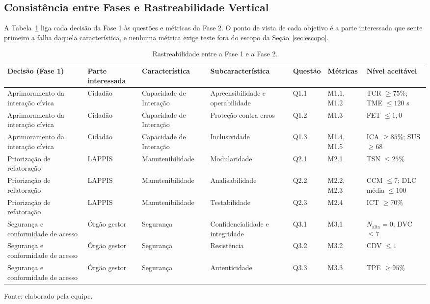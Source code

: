 \documentclass[journal]{IEEEtran}
\begin{document}
\subsection{Consistência entre Fases e Rastreabilidade Vertical}
\label{sec:rastreabilidade}

A Tabela~\ref{tab:rastreabilidade} liga cada decisão da Fase 1 às questões e métricas da Fase 2. O ponto de vista de cada objetivo é a parte interessada que sente primeiro a falha daquela característica, e nenhuma métrica exige teste fora do escopo da Seção~\ref{sec:escopo}.

\begin{table}[!t]
\centering
\caption{Rastreabilidade entre a Fase 1 e a Fase 2.}
\label{tab:rastreabilidade}
\footnotesize
\setlength{\tabcolsep}{4pt}
\begin{tabular}{@{}p{} p{} p{} p{} l p{} p{}@{}}
\toprule
\textbf{Decisão (Fase 1)} & \textbf{Parte interessada} & \textbf{Característica} & \textbf{Subcaracterística} & \textbf{Questão} & \textbf{Métricas} & \textbf{Nível aceitável} \\
\midrule
Aprimoramento da interação cívica & Cidadão & Capacidade de Interação & Apreensibilidade e operabilidade & Q1.1 & M1.1, M1.2 & TCR $\ge 75\%$; TME $\le 120$ s \\
Aprimoramento da interação cívica & Cidadão & Capacidade de Interação & Proteção contra erros & Q1.2 & M1.3 & FET $\le 1{,}0$ \\
Aprimoramento da interação cívica & Cidadão & Capacidade de Interação & Inclusividade & Q1.3 & M1.4, M1.5 & ICA $\ge 85\%$; SUS $\ge 68$ \\
Priorização de refatoração & LAPPIS & Manutenibilidade & Modularidade & Q2.1 & M2.1 & TSN $\le 25\%$ \\
Priorização de refatoração & LAPPIS & Manutenibilidade & Analisabilidade & Q2.2 & M2.2, M2.3 & CCM $\le 7$; DLC média $\le 100$ \\
Priorização de refatoração & LAPPIS & Manutenibilidade & Testabilidade & Q2.3 & M2.4 & ICT $\ge 70\%$ \\
Segurança e conformidade de acesso & Órgão gestor & Segurança & Confidencialidade e integridade & Q3.1 & M3.1 & $N_{\text{alta}} = 0$; DVC $\le 7$ \\
Segurança e conformidade de acesso & Órgão gestor & Segurança & Resistência & Q3.2 & M3.2 & CDV $\le 1$ \\
Segurança e conformidade de acesso & Órgão gestor & Segurança & Autenticidade & Q3.3 & M3.3 & TPE $\ge 95\%$ \\
\bottomrule
\end{tabular}

\vspace{2pt}
{\footnotesize Fonte: elaborado pela equipe.}
\end{table}
\end{document}
